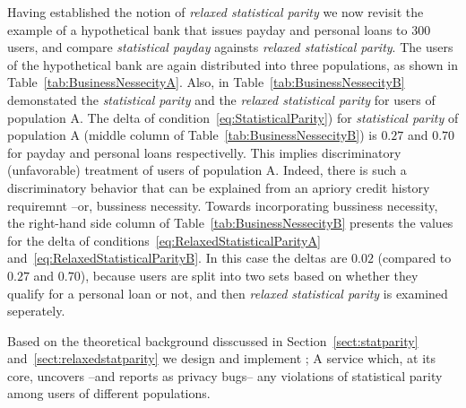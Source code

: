 Having established the notion of {\em relaxed statistical parity} we now revisit
the example of a hypothetical bank that issues payday and personal loans to 300
users, and compare {\em statistical payday} againsts {\em relaxed statistical
parity}. The users of the hypothetical bank are again distributed into three
populations, as shown in Table~\ref{tab:BusinessNessecityA}. Also, in
Table~\ref{tab:BusinessNessecityB} demonstated the {\em statistical parity}
and the {\em relaxed statistical parity} for users of population A. The delta
of condition~\ref{eq:StatisticalParity}) for {\em statistical parity} of
population A (middle column of Table~\ref{tab:BusinessNessecityB}) is $0.27$
and $0.70$ for payday and personal loans respectivelly. This implies
discriminatory (unfavorable) treatment of users of population A. Indeed, there
is such a discriminatory behavior that can be explained from an apriory
credit history requiremnt --or, bussiness necessity. Towards incorporating
bussiness necessity, the right-hand side column of
Table~\ref{tab:BusinessNessecityB} presents the values for the delta of
conditions~\ref{eq:RelaxedStatisticalParityA}
and~\ref{eq:RelaxedStatisticalParityB}. In this case the deltas are $0.02$
(compared to $0.27$ and $0.70$), because users are split into two sets
based on whether they qualify for a personal loan or not, and then
{\em relaxed statistical parity} is examined seperately.

Based on the theoretical background disscussed in Section~\ref{sect:statparity}
and~\ref{sect:relaxedstatparity} we design and implement \sysname; A service
which, at its core, uncovers --and reports as privacy bugs-- any violations
of statistical parity among users of different populations.


